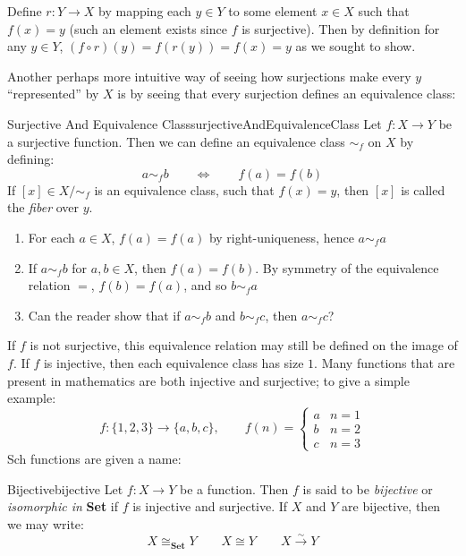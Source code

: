 \documentclass{book}
\newcommand{\rw}{\rightarrow}
\newcommand{\LRw}{\Leftrightarrow}
\begin{document}
\begin{Proof}
	Define $r: Y \rw X$ by mapping each $y \in Y$ to some element $x \in X$ such that $f(x) = y$ (such an
	element exists since $f$ is surjective). Then by definition for any $y \in Y$, $(f\circ r)(y) = f(r(y)) =
	f(x) = y$ as we sought to show.
\end{Proof}

Another perhaps more intuitive way of seeing how surjections make every $y$ ``represented'' by $X$ is by seeing that
every surjection defines an equivalence class:

\begin{prop}{Surjective And Equivalence Class}{surjectiveAndEquivalenceClass}
	Let $f: X \rw Y$ be a surjective function. Then we can define an equivalence class $\sim_f$ on $X$ by defining:
	\[
		a \sim_f b \qquad\LRw\qquad f(a) = f(b)
	\]
	If $[x] \in X/\sim_f$ is an equivalence class, such that $f(x) = y$, then $[x]$ is called the \emph{fiber}
	over $y$.
\end{prop}

\begin{Proof}
	\begin{enumerate}
		\item For each $a \in X$, $f(a) = f(a)$ by right-uniqueness, hence $a \sim_f a$
		\item If $a\sim_f b$ for $a,b \in X$, then $f(a) = f(b)$. By symmetry of the equivalence relation $=$,
			$f(b) = f(a)$, and so $b\sim_f a$
		\item Can the reader show that if $a\sim_f b$ and $b\sim_f c$, then $a\sim_f c$?
	\end{enumerate}
\end{Proof}

If $f$ is not surjective, this equivalence relation may still be defined on the image of $f$. If $f$ is
injective, then each equivalence class has size $1$. Many functions that are present in mathematics are both
injective and surjective; to give a simple example:
\begin{equation}\label{eq:3setBijective}
		f: \{1,2,3\} \to \{a,b,c\}, \qquad f(n) =  \begin{cases}
		a & n = 1\\
		b & n = 2\\
		c & n = 3
	\end{cases}
\end{equation}
Sch functions are given a name:

\begin{defn}{Bijective}{bijective}
	Let $f: X \to Y$ be a function. Then $f$ is said to be \emph{bijective} or \emph{isomorphic in} \textbf{Set} if $f$ is injective and
	surjective. If $X$ and $Y$ are bijective, then we may write:
	\[
		X\cong_{\textbf{Set}} Y\qquad X\cong Y \qquad X \xrightarrow{\sim} Y
	\]
\end{defn}
\end{document}
